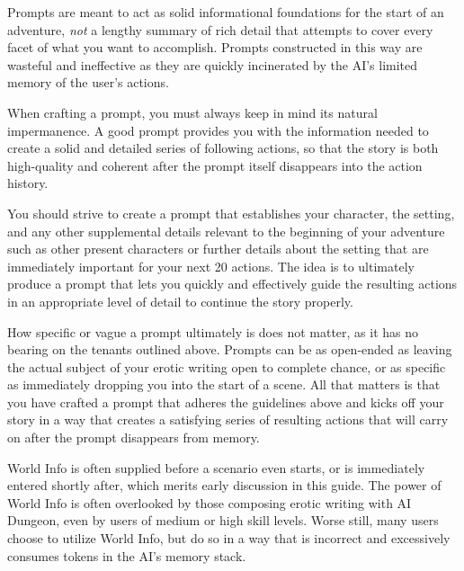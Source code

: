 \documentclass[Source-main.tex]{subfiles}
\begin{document}
Prompts are meant to act as solid informational foundations for the start of an adventure, \emph{not} a lengthy summary of rich detail that attempts to cover every facet of what you want to accomplish.
Prompts constructed in this way are wasteful and ineffective as they are quickly incinerated by the AI’s limited memory of the user’s actions.


When crafting a prompt, you must always keep in mind its natural impermanence.
A good prompt provides you with the information needed to create a solid and detailed series of following actions, so that the story is both high-quality and coherent after the prompt itself disappears into the action history.

You should strive to create a prompt that establishes your character, the setting, and any other supplemental details relevant to the beginning of your adventure such as other present characters or further details about the setting that are immediately important for your next 20 actions.
The idea is to ultimately produce a prompt that lets you quickly and effectively guide the resulting actions in an appropriate level of detail to continue the story properly.

How specific or vague a prompt ultimately is does not matter, as it has no bearing on the tenants outlined above.
Prompts can be as open-ended as leaving the actual subject of your erotic writing open to complete chance, or as specific as immediately dropping you into the start of a scene.
All that matters is that you have crafted a prompt that adheres the guidelines above and kicks off your story in a way that creates a satisfying series of resulting actions that will carry on after the prompt disappears from memory.



World Info is often supplied before a scenario even starts, or is immediately entered shortly after, which merits early discussion in this guide.
The power of World Info is often overlooked by those composing erotic writing with AI Dungeon, even by users of medium or high skill levels.
Worse still, many users choose to utilize World Info, but do so in a way that is incorrect and excessively consumes tokens in the AI’s memory stack.
\end{document}
